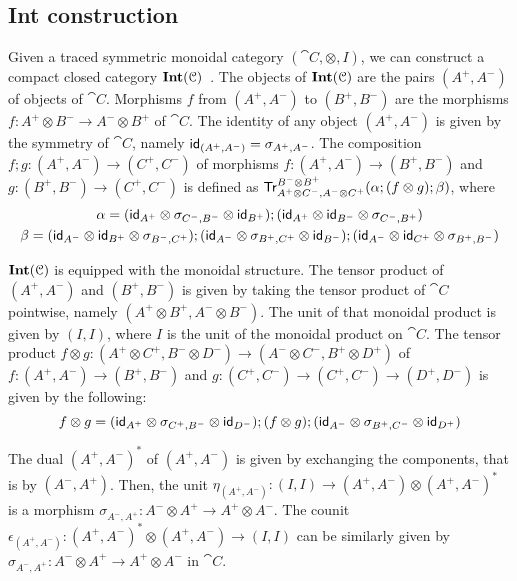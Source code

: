 \subsection{Int construction}\label{c3:subsec:int}
Given a traced symmetric monoidal category $(\cat{C}, \otimes, I)$, we can construct a compact closed category $\mathbf{Int}(\mathcal{C})$~\cite{Joyal:1996:Traced}. The objects of $\mathbf{Int}(\mathcal{C})$ are the pairs $(A^+,A^-)$ of objects of $\cat{C}$. Morphisms $f$ from $(A^+, A^-)$ to $(B^+, B^-)$ are the morphisms $f \colon A^+ \otimes B^- \to A^- \otimes B^+$ of $\cat{C}$. The identity of any object $(A^+, A^-)$ is given by the symmetry of $\cat{C}$, namely $\mathsf{id}_{(A^ +, A^-)} = \sigma_{A^+, A^-}$. The composition $f ; g \colon (A^+, A^-) \to (C^+, C^-)$ of morphisms $f \colon (A^+, A^-) \to (B^{+}, B^-)$ and $g \colon (B^+, B^-) \to (C^+,C^-)$ is defined as
	$
		\mathsf{Tr}^{B^- \otimes B^+}_{A^+ \otimes C^-, A^- \otimes C^+} (\alpha ; (f \otimes g) ; \beta)
	$, where \begin{gather*}\alpha = (\mathsf{id}_{A^+} \otimes \sigma_{C^-, B^-} \otimes \mathsf{id}_{B^+});(\mathsf{id}_{A^+} \otimes \mathsf{id}_{B^-} \otimes \sigma_{C^-, B^+})\\\beta = (\mathsf{id}_{A^-} \otimes \mathsf{id}_{B^+} \otimes \sigma_{B^-, C^+}); (\mathsf{id}_{A^-} \otimes \sigma_{B^+, C^+} \otimes \mathsf{id}_{B^-});(\mathsf{id}_{A^-} \otimes \mathsf{id}_{C^+} \otimes \sigma_{B^+, B^-})\end{gather*}
	
	$\mathbf{Int}(\mathcal{C})$ is equipped with the monoidal structure. The tensor product of $(A^+, A^-)$ and $(B^+, B^-)$ is given by taking the tensor product of $\cat{C}$ pointwise, namely $(A^+ \otimes B^+, A^- \otimes B^-)$. The unit of that monoidal product is given by $(I, I)$, where $I$ is the unit of the monoidal product on $\cat{C}$. The tensor product $f \otimes g \colon (A^+ \otimes C^+, B^- \otimes D^-) \to (A^- \otimes C^-, B^+ \otimes D^+)$ of $f \colon (A^+, A^-) \to (B^+, B^-)$ and $g \colon (C^+, C^-) \to (C^+, C^-) \to (D^+, D^-)$ is given by the following:
	$$
	f \otimes g = (\mathsf{id}_{A^+} \otimes \sigma_{C^+, B^-} \otimes \mathsf{id}_{D^-});(f \otimes g);(\mathsf{id}_{A^-} \otimes \sigma_{B^+, C^-} \otimes \mathsf{id}_{D^+})
	$$
	
	The dual $(A^+, A^-)^{\ast}$ of $(A^+, A^-)$ is given by exchanging the components, that is by $(A^-, A^+)$. Then, the unit $\eta_{(A^+, A^-)} \colon (I,I) \to (A^+, A^-) \otimes (A^+, A^-)^{\ast}$ is a morphism $\sigma_{A^-, A^+} \colon A^- \otimes A^+ \to A^+ \otimes A^-$. The counit $\epsilon_{(A^+, A^-)} \colon (A^+, A^-)^\ast \otimes (A^+, A^-) \to (I,I)$ can be similarly given by $\sigma_{A^-, A^+} \colon A^- \otimes A^+ \to A^+ \otimes A^-$ in $\cat{C}$.
	
